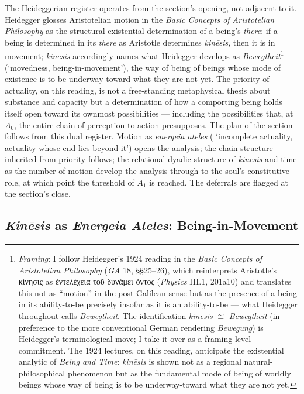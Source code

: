 The Heideggerian register operates from the section's opening, not adjacent to it. Heidegger glosses Aristotelian motion in the \textit{Basic Concepts of Aristotelian Philosophy} as the structural-existential determination of a being's \textit{there}: if a being is determined in its \textit{there} as Aristotle determines \textit{kinēsis}, then it is in movement; \textit{kinēsis} accordingly names what Heidegger develops as \textit{Bewegtheit}\footnote{\textit{Framing}: I follow Heidegger's 1924 reading in the \textit{Basic Concepts of Aristotelian Philosophy} (\textit{GA} 18, §§25--26), which reinterprets Aristotle's κίνησις as ἐντελέχεια τοῦ δυνάμει ὄντος (\textit{Physics} III.1, 201a10) and translates this not as ``motion'' in the post-Galilean sense but as the presence of a being in its ability-to-be precisely insofar as it is an ability-to-be --- what Heidegger throughout calls \textit{Bewegtheit}. The identification \textit{kin\=esis} $\cong$ \textit{Bewegtheit} (in preference to the more conventional German rendering \textit{Bewegung}) is Heidegger's terminological move; I take it over as a framing-level commitment. The 1924 lectures, on this reading, anticipate the existential analytic of \textit{Being and Time}: \textit{kin\=esis} is shown not as a regional natural-philosophical phenomenon but as the fundamental mode of being of worldly beings whose way of being is to be underway-toward what they are not yet.} (`movedness, being-in-movement'), the way of being of beings whose mode of existence is to be underway toward what they are not yet. The priority of actuality, on this reading, is not a free-standing metaphysical thesis about substance and capacity but a determination of how a comporting being holds itself open toward its ownmost possibilities --- including the possibilities that, at $A_0$, the entire chain of perception-to-action presupposes. The plan of the section follows from this dual register. Motion as \textit{energeia ateles} ( `incomplete actuality, actuality whose end lies beyond it') opens the analysis; the chain structure inherited from priority follows; the relational dyadic structure of \textit{kinēsis} and time as the number of motion develop the analysis through to the soul's constitutive role, at which point the threshold of $A_1$ is reached. The deferrals are flagged at the section's close.

\subsection{\textit{Kinēsis} as \textit{Energeia Ateles}: Being-in-Movement}

